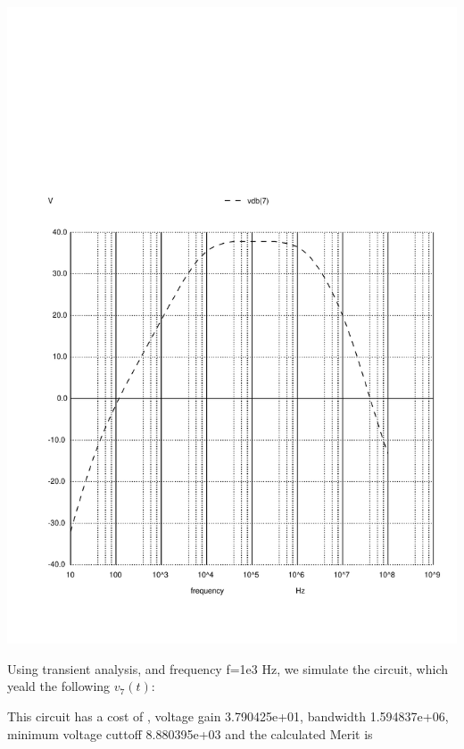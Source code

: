 \includegraphics[width=1\linewidth]{../sim/vo2f.pdf}

\par

Using transient analysis, and frequency f=1e3 Hz, we simulate the circuit, which yeald the following $v_7(t)$:




This circuit has a cost of , voltage gain 3.790425e+01, bandwidth 1.594837e+06, minimum voltage cuttoff 8.880395e+03 and the  calculated Merit is 
